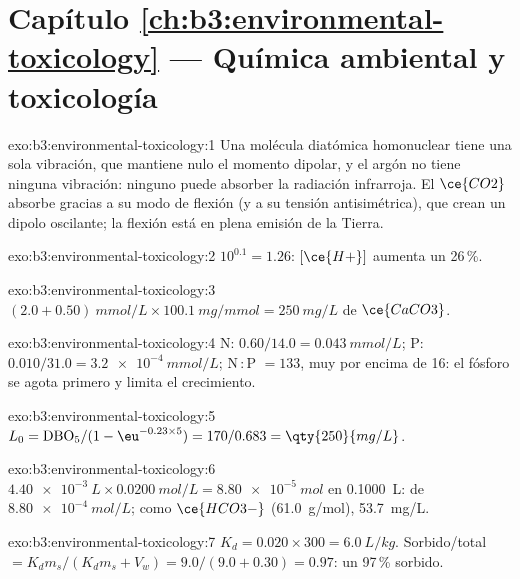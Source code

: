 \section*{Capítulo \ref{ch:b3:environmental-toxicology} --- Química ambiental y toxicología}

\begin{solution}{exo:b3:environmental-toxicology:1}
Una molécula diatómica homonuclear tiene una sola vibración, que mantiene nulo el momento dipolar,
y el argón no tiene ninguna vibración: ninguno puede absorber la radiación infrarroja. El $\ce{CO2}$ absorbe gracias a
su modo de flexión (y a su tensión antisimétrica), que crean un dipolo
oscilante; la flexión está en plena emisión de la Tierra.
\end{solution}

\begin{solution}{exo:b3:environmental-toxicology:2}
$10^{0.1} = 1.26$: $[\ce{H+}]$ aumenta un 26\,\%.
\end{solution}

\begin{solution}{exo:b3:environmental-toxicology:3}
$(2.0 + 0.50)\ \unit{mmol/L} \times \qty{100.1}{mg/mmol} = \qty{250}{mg/L}$ de $\ce{CaCO3}$.
\end{solution}

\begin{solution}{exo:b3:environmental-toxicology:4}
N: $0.60/14.0 = \qty{0.043}{mmol/L}$; P: $0.010/31.0 = \qty{3.2e-4}{mmol/L}$; N\,:\,P $= 133$, muy por encima de 16: el fósforo se agota
primero y limita el crecimiento.
\end{solution}

\begin{solution}{exo:b3:environmental-toxicology:5}
$L_0 = \mathrm{DBO_5}/(1 - \eu^{-0.23 \times 5}) = 170/0.683 = \qty{250}{mg/L}$.
\end{solution}

\begin{solution}{exo:b3:environmental-toxicology:6}
$\qty{4.40e-3}{L} \times \qty{0.0200}{mol/L} = \qty{8.80e-5}{mol}$ en \qty{0.1000}{L}:  de $\qty{8.80e-4}{mol/L}$; como $\ce{HCO3-}$ (\qty{61.0}{g/mol}),
\qty{53.7}{mg/L}.
\end{solution}

\begin{solution}{exo:b3:environmental-toxicology:7}
$K_d = 0.020 \times 300 = \qty{6.0}{L/kg}$. Sorbido/total $= K_dm_s/(K_dm_s + V_w) = 9.0/(9.0 + 0.30) = 0.97$: un 97\,\% sorbido.
\end{solution}

